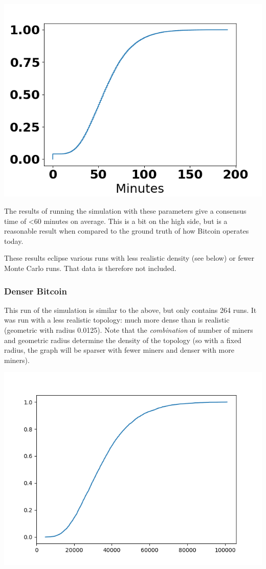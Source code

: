 \documentclass[letterpaper,11pt]{article}
\begin{document}
\includegraphics[scale=0.5]{realbctimes}

The results of running the simulation with these parameters give a consensus time of <60 minutes on average. This is a bit on the high side, but is a reasonable result when compared to the ground truth of how Bitcoin operates today.

These results eclipse various runs with less realistic density (see below) or fewer Monte Carlo runs. That data is therefore not included.

\subsubsection{Denser Bitcoin}
This run of the simulation is similar to the above, but only contains 264 runs. It was run with a less realistic topology: much more dense than is realistic (geometric with radius 0.0125). Note that the \textit{combination} of number of miners and geometric radius determine the density of the topology (so with a fixed radius, the graph will be sparser with fewer miners and denser with more miners).

\includegraphics[scale=0.5]{densebctimes}
\end{document}
